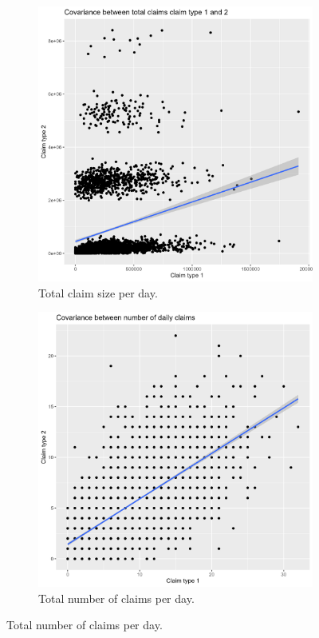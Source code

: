 \documentclass[11pt]{article}
\begin{document}
\begin{figure}[h!]
    \begin{subfigure}{.49\textwidth}
        \centering
        \includegraphics[width=.9\linewidth]{plots/covariance/daily_claim_size.png}
        \caption{Total claim size per day.}
        \label{a3:claimamount}
    \end{subfigure}
    \begin{subfigure}{.49\textwidth}
        \centering
        \includegraphics[width=.9\linewidth]{plots/covariance/daily_claim_number.png}
        \caption{Total number of claims per day.}
        \label{a3:claimcount}
    \end{subfigure}
\end{figure}
\end{document}

